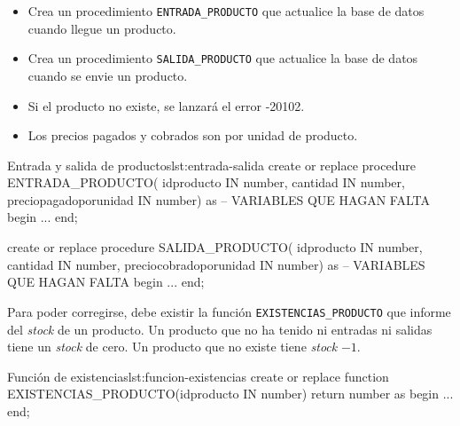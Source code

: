 \begin{homeworkProblem}

  \begin{itemize}
  \item Crea un procedimiento \texttt{ENTRADA\_PRODUCTO} que actualice la base de datos cuando llegue un producto.
  \item Crea un procedimiento \texttt{SALIDA\_PRODUCTO} que actualice la base de datos cuando se envie un producto.
  \item Si el producto no existe, se lanzará el error -20102.
  \item Los precios pagados y cobrados son por unidad de producto.
  \end{itemize}



  
  \begin{listadosql}{Entrada y salida de productos}{lst:entrada-salida}
create or replace procedure ENTRADA_PRODUCTO(
  idproducto IN number,
  cantidad IN number,
  preciopagadoporunidad IN number)
as
  -- VARIABLES QUE HAGAN FALTA
begin
  ...
end; 

create or replace procedure SALIDA_PRODUCTO(
  idproducto IN number,
  cantidad IN number,
  preciocobradoporunidad IN number)
as
  -- VARIABLES QUE HAGAN FALTA
begin
  ...
end; 
  \end{listadosql}


  
  Para poder corregirse, debe existir la función \texttt{EXISTENCIAS\_PRODUCTO} que informe del \textit{stock} de un producto. Un producto que no ha tenido ni entradas ni salidas tiene un \textit{stock} de cero. Un producto que no existe tiene \textit{stock} $-1$.

  \begin{listadosql}{Función de existencias}{lst:funcion-existencias}
create or replace function EXISTENCIAS_PRODUCTO(idproducto IN number) return number
as
begin
  ...
end; 
  \end{listadosql}  
  


\end{homeworkProblem}


